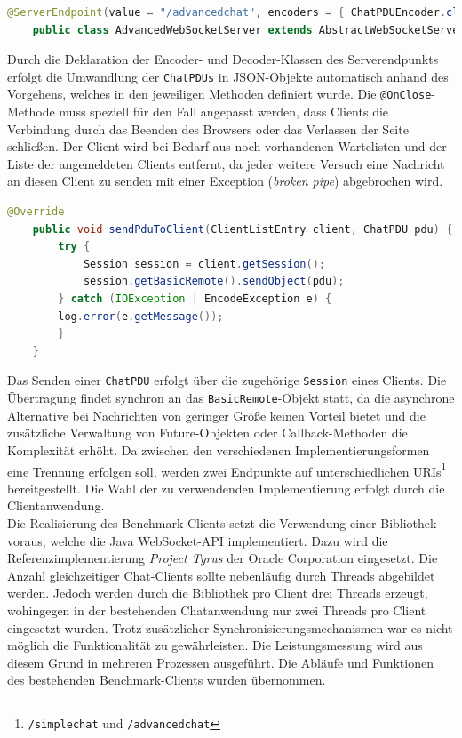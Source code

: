 \documentclass[11pt,a4paper,titlepage]{scrartcl}
\numberwithin{equation}{section}
\begin{document}
\begin{lstlisting}[frame=single, language=Java, caption=AdvancedWebSocketServer Annotation,label=lst:wsServerImpl]
	@ServerEndpoint(value = "/advancedchat", encoders = { ChatPDUEncoder.class }, decoders = { ChatPDUDecoder.class })
	public class AdvancedWebSocketServer extends AbstractWebSocketServer { ... }
\end{lstlisting}

\noindent Durch die Deklaration der Encoder- und Decoder-Klassen des Serverendpunkts erfolgt die Umwandlung der \texttt{ChatPDUs} in JSON-Objekte automatisch anhand des Vorgehens, welches in den jeweiligen Methoden definiert wurde. Die \texttt{@OnClose}-Methode muss speziell für den Fall angepasst werden, dass Clients die Verbindung durch das Beenden des Browsers oder das Verlassen der Seite schließen. Der Client wird bei Bedarf aus noch vorhandenen Wartelisten und der Liste der angemeldeten Clients entfernt, da jeder weitere Versuch eine Nachricht an diesen Client zu senden mit einer Exception (\textit{broken pipe}) abgebrochen wird.\medskip

\begin{lstlisting}[frame=single, language=Java, caption=Senden einer ChatPDU label=lst:wsServerPDU]
	@Override
	public void sendPduToClient(ClientListEntry client, ChatPDU pdu) {
		try {
			Session session = client.getSession();
			session.getBasicRemote().sendObject(pdu);
		} catch (IOException | EncodeException e) {
		log.error(e.getMessage());
		}
	}
\end{lstlisting}

\noindent Das Senden einer \texttt{ChatPDU} erfolgt über die zugehörige \texttt{Session} eines Clients. Die Übertragung findet synchron an das \texttt{BasicRemote}-Objekt statt, da die asynchrone Alternative bei Nachrichten von geringer Größe keinen Vorteil bietet und die zusätzliche Verwaltung von Future-Objekten oder Callback-Methoden die Komplexität erhöht. Da zwischen den verschiedenen Implementierungsformen eine Trennung erfolgen soll, werden zwei Endpunkte auf unterschiedlichen URIs\footnote{\texttt{/simplechat} und \texttt{/advancedchat}} bereitgestellt. Die Wahl der zu verwendenden Implementierung erfolgt durch die Clientanwendung. \\

\noindent Die Realisierung des Benchmark-Clients setzt die Verwendung einer Bibliothek voraus, welche die Java WebSocket-API implementiert. Dazu wird die Referenzimplementierung \textit{Project Tyrus} der Oracle Corporation eingesetzt. Die Anzahl gleichzeitiger Chat-Clients sollte nebenläufig durch Threads abgebildet werden. Jedoch werden durch die Bibliothek pro Client drei Threads erzeugt, wohingegen in der bestehenden Chatanwendung nur zwei Threads pro Client eingesetzt wurden. Trotz zusätzlicher Synchronisierungsmechanismen war es nicht möglich die Funktionalität zu gewährleisten. Die Leistungsmessung wird aus diesem Grund in mehreren Prozessen ausgeführt. Die Abläufe und Funktionen des bestehenden Benchmark-Clients wurden übernommen.\\
\end{document}
